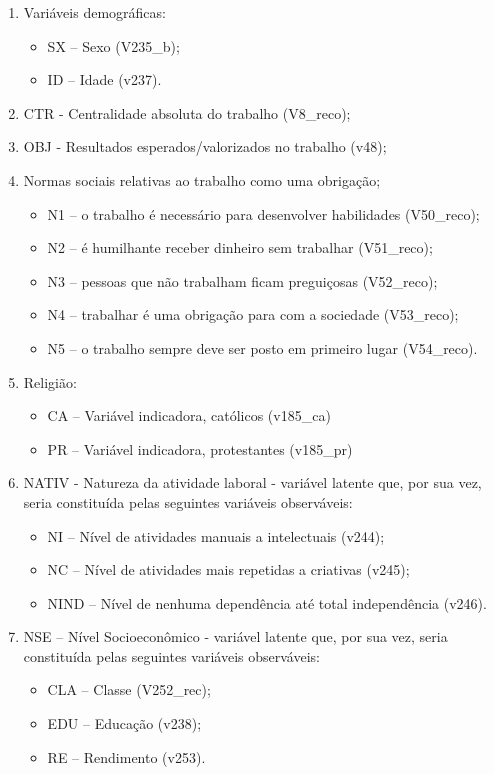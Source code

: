 \documentclass[
  12pt,
]{article}
\providecommand{\tightlist}{%
  \setlength{\itemsep}{0pt}\setlength{\parskip}{0pt}}
\begin{document}
\begin{enumerate}
\def\labelenumi{\arabic{enumi}.}
\tightlist
\item
  Variáveis demográficas:

  \begin{itemize}
  \tightlist
  \item
    SX -- Sexo (V235\_b);
  \item
    ID -- Idade (v237).
  \end{itemize}
\item
  CTR - Centralidade absoluta do trabalho (V8\_reco);
\item
  OBJ - Resultados esperados/valorizados no trabalho (v48);
\item
  Normas sociais relativas ao trabalho como uma obrigação;

  \begin{itemize}
  \tightlist
  \item
    N1 -- o trabalho é necessário para desenvolver habilidades
    (V50\_reco);
  \item
    N2 -- é humilhante receber dinheiro sem trabalhar (V51\_reco);
  \item
    N3 -- pessoas que não trabalham ficam preguiçosas (V52\_reco);
  \item
    N4 -- trabalhar é uma obrigação para com a sociedade (V53\_reco);
  \item
    N5 -- o trabalho sempre deve ser posto em primeiro lugar
    (V54\_reco).
  \end{itemize}
\item
  Religião:

  \begin{itemize}
  \tightlist
  \item
    CA -- Variável indicadora, católicos (v185\_ca)
  \item
    PR -- Variável indicadora, protestantes (v185\_pr)
  \end{itemize}
\item
  NATIV - Natureza da atividade laboral - variável latente que, por sua
  vez, seria constituída pelas seguintes variáveis observáveis:

  \begin{itemize}
  \tightlist
  \item
    NI -- Nível de atividades manuais a intelectuais (v244);
  \item
    NC -- Nível de atividades mais repetidas a criativas (v245);
  \item
    NIND -- Nível de nenhuma dependência até total independência (v246).
  \end{itemize}
\item
  NSE -- Nível Socioeconômico - variável latente que, por sua vez, seria
  constituída pelas seguintes variáveis observáveis:

  \begin{itemize}
  \tightlist
  \item
    CLA -- Classe (V252\_rec);
  \item
    EDU -- Educação (v238);
  \item
    RE -- Rendimento (v253).
  \end{itemize}
\end{enumerate}
\end{document}
